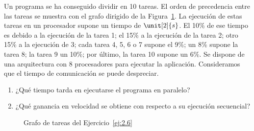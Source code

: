 \begin{ejercicio} \label{ej:2.6}
    Un programa se ha conseguido dividir en 10 tareas. El orden de precedencia entre las tareas se
    muestra con el grafo dirigido de la Figura~\ref{fig:Grafo_2.6}. La ejecución de estas tareas en un procesador supone un tiempo de $\unit[2]{s}$.
    El 10\% de ese tiempo es debido a la ejecución de la tarea 1; el 15\% a la ejecución de la tarea 2; otro 15\% a la ejecución de 3;
    cada tarea 4, 5, 6 o 7 supone el 9\%; un 8\% supone la tarea 8; la tarea 9 un 10\%; por último, la tarea 10 supone un 6\%.
    Se dispone de una arquitectura con 8 procesadores para ejecutar la aplicación. Consideramos que el tiempo de comunicación se puede despreciar.
    \begin{enumerate}
        \item ¿Qué tiempo tarda en ejecutarse el programa en paralelo?
        \item ¿Qué ganancia en velocidad se obtiene con respecto a su ejecución secuencial?
    \end{enumerate}
    \begin{figure}[H]
        \centering
        \caption{Grafo de tareas del Ejercicio~\ref{ej:2.6}}
        \label{fig:Grafo_2.6}
    \end{figure}


\end{ejercicio}
